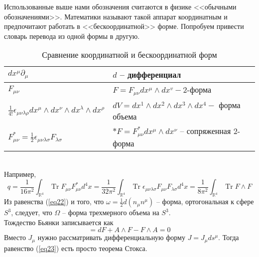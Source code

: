 \documentclass[12pt]{article}
\theoremstyle{definition}
\begin{document}
Использованные выше нами обозначения считаются в физике <<обычными обозначениями>>. Математики называют такой аппарат координатным и предпочитают работать в <<бескоординатной>> форме. Попробуем привести словарь перевода из одной формы в другую.
\begin{table}[h!]
    \centering
    \begin{tabular}{|l|l|}
    \hline$dx^\mu \partial_\mu$ & $d$ -- дифференциал \\
    \hline$F_{\mu\nu}$ & $F=F_{\mu \nu} d x^\mu \wedge d x^v-2$-форма \\
    \hline$\frac{1}{4 !} \epsilon_{\mu\nu\lambda\rho} dx^\mu \wedge d x^\nu \wedge d x^\lambda \wedge d x^\rho$ & $d V=d x^1 \wedge d x^2 \wedge d x^3 \wedge dx^4-$ форма объема \\
    \hline$F_{\mu\nu}^*=\frac{1}{2}\epsilon_{\mu\nu\lambda\sigma} F_{\lambda\sigma}$ & $*F=F_{\mu\nu}^*dx^\mu \wedge d x^\nu$ -- сопряженная 2-форма \\\hline
\end{tabular}
    \caption{Сравнение координатной и бескоординатной форм}
    \label{tab:my_label}
\end{table}\\
Например,
\begin{equation}
    q=\frac{1}{16 \pi^2} \int_{\mathbb{R}^4} \operatorname{Tr} F_{\mu \nu} F_{\mu \nu}^* d^4 x=\frac{1}{32 \pi^2} \int_{\mathbb{R}^4} \operatorname{Tr} \epsilon_{\mu \nu \lambda \sigma} F_{\mu \nu} F_{\lambda \sigma} d^4 x=\frac{1}{8 \pi^2} \int_{\mathbb{R}^4} \operatorname{Tr} F \wedge F
\end{equation}
Из равенства (\ref{eq22}) и того, что $\omega=\frac{1}{2} d(n_\mu n^\mu)$ -- форма, ортогональная к сфере $S^3$, следует, что $\Omega$ -- форма трехмерного объема на $S^3$.\\
Тождество Бьянки записывается как
\begin{equation}
    [\nabla, F]=d F+A \wedge F-F \wedge A=0
\end{equation}
Вместо $J_\mu$ нужно рассматривать дифференциальную форму $J=J_\mu d s^\mu$. Тогда равенство (\ref{eq23}) есть просто теорема Стокса.
\end{document}

